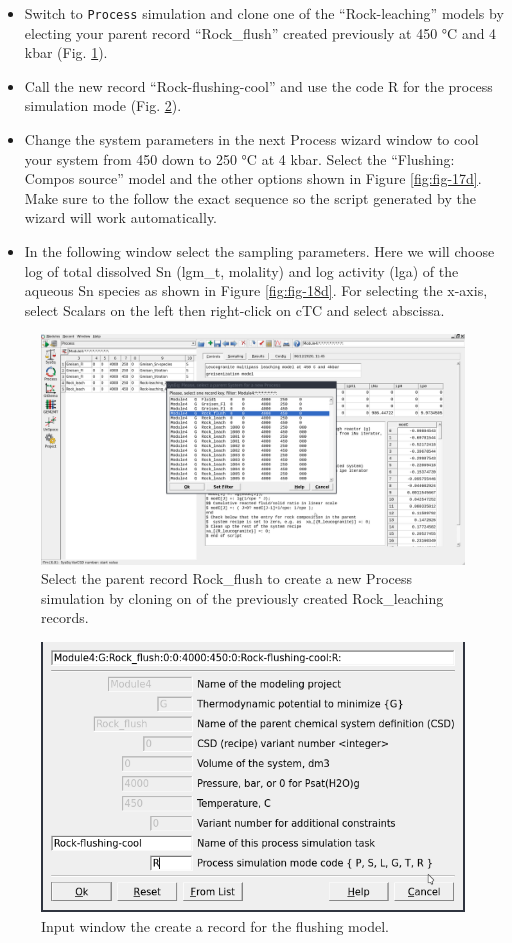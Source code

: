 \documentclass[
]{book}
\begin{document}
\begin{itemize}
\item
  Switch to \texttt{Process} simulation and clone one of the ``Rock-leaching'' models by electing your parent record ``Rock\_flush'' created previously at 450 °C and 4 kbar (Fig. \ref{fig:fig-15d}).
\item
  Call the new record ``Rock-flushing-cool'' and use the code R for the process simulation mode (Fig. \ref{fig:fig-16d}).
\item
  Change the system parameters in the next Process wizard window to cool your system from 450 down to 250 °C at 4 kbar. Select the ``Flushing: Compos source'' model and the other options shown in Figure \ref{fig:fig-17d}. Make sure to the follow the exact sequence so the script generated by the wizard will work automatically.
\item
  In the following window select the sampling parameters. Here we will choose log of total dissolved Sn (lgm\_t, molality) and log activity (lga) of the aqueous Sn species as shown in Figure \ref{fig:fig-18d}. For selecting the x-axis, select Scalars on the left then right-click on cTC and select abscissa.
\end{itemize}

\begin{figure}
\includegraphics[width=1\linewidth]{figures/module4/fig-15} \caption{Select the parent record Rock\_flush to create a new Process simulation by cloning on of the previously created Rock\_leaching records.}\label{fig:fig-15d}
\end{figure}

\begin{figure}
\includegraphics[width=0.7\linewidth]{figures/module4/fig-16} \caption{Input window the create a record for the flushing model.}\label{fig:fig-16d}
\end{figure}
\end{document}
